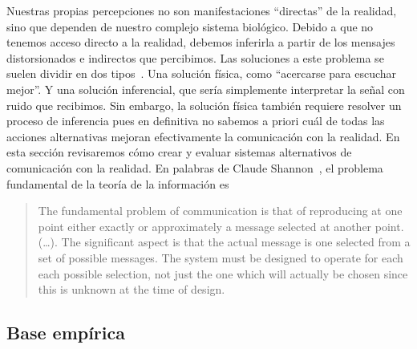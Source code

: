 \documentclass[a4paper,11pt]{book}
\theoremstyle{definition}
\begin{document}
Nuestras propias percepciones no son manifestaciones ``directas'' de la realidad, sino que dependen de nuestro complejo sistema biol\'ogico.
%
Debido a que no tenemos acceso directo a la realidad, debemos inferirla a partir de los mensajes distorsionados e indirectos que percibimos.
%
Las soluciones a este problema se suelen dividir en dos tipos~\cite{Mackay2003}.
%
Una soluci\'on f\'isica, como ``acercarse para escuchar mejor''.
%
Y una soluci\'on inferencial, que ser\'ia simplemente interpretar la se\~nal con ruido que recibimos.
%
Sin embargo, la soluci\'on f\'isica tambi\'en requiere resolver un proceso de inferencia pues en definitiva no sabemos a priori cu\'al de todas las acciones alternativas mejoran efectivamente la comunicaci\'on con la realidad.
%
En esta secci\'on revisaremos c\'omo crear y evaluar sistemas alternativos de comunicaci\'on con la realidad.
%
En palabras de Claude Shannon~\cite{shannon1948-theoryOfCommunication}, el problema fundamental de la teor\'ia de la informaci\'on es
%
\begin{quotation}
The fundamental problem of communication is that of reproducing at one point either exactly or approximately a message selected at another point.
(\dots).
The significant aspect is that the actual message is one selected from a set of possible messages.
The system must be designed to operate for each each possible selection, not just the one which will actually be chosen since this is unknown at the time of design.
\end{quotation}

\subsection{Base emp\'irica}
\end{document}
